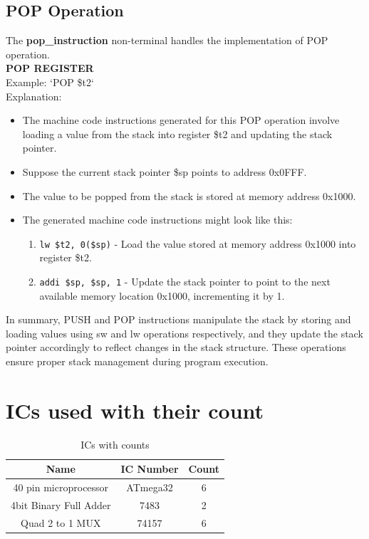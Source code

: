 \documentclass[a4paper]{article}
\begin{document}
\subsection{POP Operation}
The \textbf{pop\_instruction} non-terminal handles the implementation of POP operation.\\
\textbf{POP REGISTER}\\
Example: `POP \$t2`\\
Explanation:
\begin{itemize}
    \item The machine code instructions generated for this POP operation involve loading a value from the stack into register \$t2 and updating the stack pointer.
    \item Suppose the current stack pointer \$sp points to address 0x0FFF.
    \item The value to be popped from the stack is stored at memory address 0x1000.
    \item The generated machine code instructions might look like this:
    \begin{enumerate}
        \item \texttt{lw \$t2, 0(\$sp)} - Load the value stored at memory address 0x1000 into register \$t2.
       \item \texttt{addi \$sp, \$sp, 1} - Update the stack pointer to point to the next available memory location 0x1000, incrementing it by 1.
    \end{enumerate}
\end{itemize}

In summary, PUSH and POP instructions manipulate the stack by storing and loading values using sw and lw operations respectively, and they update the stack pointer accordingly to reflect changes in the stack structure. These operations ensure proper stack management during program execution.\\

\section{ICs used with their count}
\begin{table}[H]
    \centering
    \begin{tabular}{|c|c|c|}
    \hline
        Name & IC Number & Count \\
    \hline
        40 pin microprocessor & ATmega32  & 6\\
        \hline
        4bit Binary Full Adder  & 7483 & 2\\
        \hline
        Quad 2 to 1 MUX & 74157 & 6\\
        \hline
    \end{tabular}
    \caption{ICs with counts}
\end{table}
\end{document}
